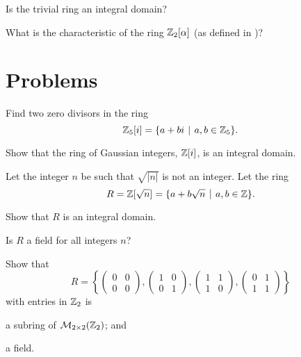 \begin{exercise}\label{exercise-trivial-ring-is-not-an-integral-domain}
    Is the trivial ring an integral domain?
\end{exercise}
\begin{exercise}
    What is the characteristic of the ring $\mathbb{Z}_2[\alpha]$ (as defined in )?
\end{exercise} 

\newpage

\section{Problems}
\begin{problem}
    Find two zero divisors in the ring
    \[
        \Z_5[i] = \{a + bi \vert a,b\in\Z_5\}.
    \]
\end{problem}

\begin{problem}
    Show that the ring of Gaussian integers, $\mathbb{Z}[i]$, is an integral domain.
\end{problem}

\begin{problem}
    Let the integer $n$ be such that $\sqrt{|n|}$ is not an integer. Let the ring
    \[
        R = \Z[\sqrt{n}] = \{a + b\sqrt{n} \vert a,b\in \Z\}.
    \]
    \begin{partquestions}{\alph*}
        \item Show that $R$ is an integral domain.
        \item Is $R$ a field for all integers $n$?
    \end{partquestions}
\end{problem}

\begin{problem}
    Show that
    \[
        R = \left\{\begin{pmatrix}0&0\\0&0\end{pmatrix},\begin{pmatrix}1&0\\0&1\end{pmatrix},\begin{pmatrix}1&1\\1&0\end{pmatrix},\begin{pmatrix}0&1\\1&1\end{pmatrix}\right\}
    \]
    with entries in $\mathbb{Z}_2$ is
    \begin{partquestions}{\roman*}
        \item a subring of $\mathcal{M}_{2\times2}(\mathbb{Z}_2)$; and
        \item a field.
    \end{partquestions}
\end{problem}
